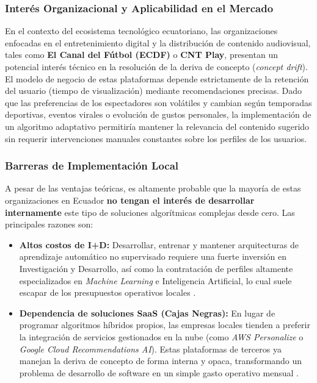 \documentclass[12pt]{article}
\begin{document}
\subsubsection{Interés Organizacional y Aplicabilidad en el Mercado}

En el contexto del ecosistema tecnológico ecuatoriano, las organizaciones enfocadas en el entretenimiento digital y la distribución de contenido audiovisual, tales como \textbf{El Canal del Fútbol (ECDF)} o \textbf{CNT Play}, presentan un potencial interés técnico en la resolución de la deriva de concepto (\textit{concept drift}). El modelo de negocio de estas plataformas depende estrictamente de la retención del usuario (tiempo de visualización) mediante recomendaciones precisas. Dado que las preferencias de los espectadores son volátiles y cambian según temporadas deportivas, eventos virales o evolución de gustos personales, la implementación de un algoritmo adaptativo permitiría mantener la relevancia del contenido sugerido sin requerir intervenciones manuales constantes sobre los perfiles de los usuarios.

\subsubsection*{Barreras de Implementación Local}
A pesar de las ventajas teóricas, es altamente probable que la mayoría de estas organizaciones en Ecuador \textbf{no tengan el interés de desarrollar internamente} este tipo de soluciones algorítmicas complejas desde cero. Las principales razones son:

\begin{itemize}
    \item \textbf{Altos costos de I+D:} Desarrollar, entrenar y mantener arquitecturas de aprendizaje automático no supervisado requiere una fuerte inversión en Investigación y Desarrollo, así como la contratación de perfiles altamente especializados en \textit{Machine Learning} e Inteligencia Artificial, lo cual suele escapar de los presupuestos operativos locales \cite{aws_personalize}.
    \item \textbf{Dependencia de soluciones SaaS (Cajas Negras):} En lugar de programar algoritmos híbridos propios, las empresas locales tienden a preferir la integración de servicios gestionados en la nube (como \textit{AWS Personalize} o \textit{Google Cloud Recommendations AI}). Estas plataformas de terceros ya manejan la deriva de concepto de forma interna y opaca, transformando un problema de desarrollo de software en un simple gasto operativo mensual \cite{aws_personalize}.
\end{itemize}
\end{document}
